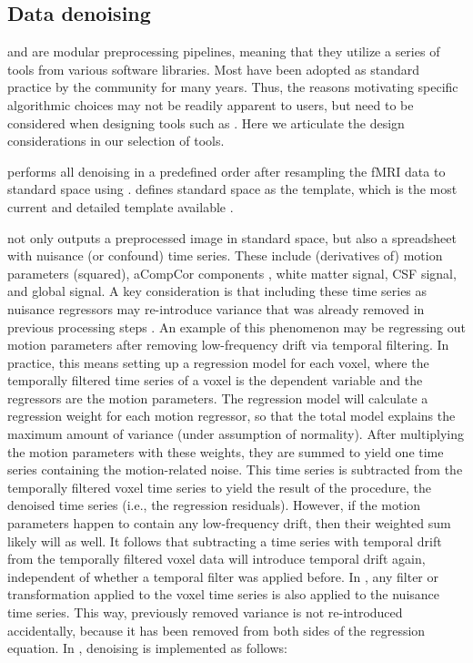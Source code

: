\subsection{Data denoising}\label{sec:denoising}

 and  are modular preprocessing pipelines,
meaning that they utilize a series of tools from various software
libraries. Most have been adopted as standard practice by the community for
many years. Thus, the reasons motivating specific algorithmic choices may
not be readily apparent to users, but need to be considered when designing
tools such as . Here we articulate the design considerations
in our selection of tools.

 performs all denoising in a predefined order after
resampling the fMRI data to standard space using .
 defines standard space as the 
template, which is the most current and detailed template available
\citep{horn_blog}.

 not only outputs a preprocessed image in standard space,
but also a spreadsheet with nuisance (or confound) time series. These
include (derivatives of) motion parameters (squared), aCompCor components
\citep{10.1016/j.neuroimage.2007.04.042}, white matter signal, CSF signal,
and global signal. A key consideration is that including these time series
as nuisance regressors may re-introduce variance that was already removed
in previous processing steps \citep{10.1016/j.neuroimage.2013.05.116}. An
example of this phenomenon may be regressing out motion parameters after
removing low-frequency drift via temporal filtering. In practice, this
means setting up a regression model for each voxel, where the temporally
filtered time series of a voxel is the dependent variable and the
regressors are the motion parameters. The regression model will calculate a
regression weight for each motion regressor, so that the total model
explains the maximum amount of variance (under assumption of normality).
After multiplying the motion parameters with these weights, they are summed
to yield one time series containing the motion-related noise. This time
series is subtracted from the temporally filtered voxel time series to
yield the result of the procedure, the denoised time series (i.e., the
regression residuals). However, if the motion parameters happen to contain
any low-frequency drift, then their weighted sum likely will as well. It
follows that subtracting a time series with temporal drift from the
temporally filtered voxel data will introduce temporal drift again,
independent of whether a temporal filter was applied before. In
, any filter or transformation applied to the voxel time
series is also applied to the nuisance time series. This way, previously
removed variance is not re-introduced accidentally, because it has been
removed from both sides of the regression equation. In ,
denoising is implemented as follows:

